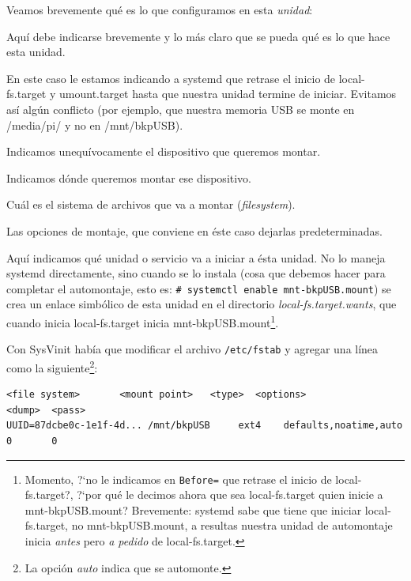 \documentclass[10pt,a4paper]{article}
\begin{document}
Veamos brevemente qu\'e es lo que configuramos en esta \emph{unidad}:

\begin{description}
\label{sec:wantedBy}
    \item [Description=] Aqu\'i debe indicarse brevemente y lo m\'as claro que se pueda qu\'e es lo que hace esta unidad.
    \item [Before=] En este caso le estamos indicando a systemd que retrase el inicio de local-fs.target y umount.target hasta que nuestra unidad termine de iniciar. Evitamos as\'i alg\'un conflicto (por ejemplo, que nuestra memoria USB se monte en /media/pi/ y no en /mnt/bkpUSB).\\
    \item [What=] Indicamos unequ\'ivocamente el dispositivo que queremos montar.
    \item [Where=] Indicamos d\'onde queremos montar ese dispositivo.
    \item [Type=] Cu\'al es el sistema de archivos que va a montar (\emph{filesystem}).
    \item [Options=] Las opciones de montaje, que conviene en \'este caso dejarlas predeterminadas.
    \item [WantedBy=] Aqu\'i indicamos qu\'e unidad o servicio va a iniciar a \'esta unidad. No lo maneja systemd directamente, sino cuando se lo instala (cosa que debemos hacer para completar el automontaje, esto es: \lstinline{# systemctl enable mnt-bkpUSB.mount}) se crea un enlace simb\'olico de esta unidad en el directorio \emph{local-fs.target.wants}, que cuando inicia local-fs.target inicia mnt-bkpUSB.mount\footnote{Momento, ?`no le indicamos en \texttt{Before=} que retrase el inicio de local-fs.target?, ?`por qu\'e le decimos ahora que sea local-fs.target quien inicie a mnt-bkpUSB.mount? Brevemente: systemd sabe que tiene que iniciar local-fs.target, no mnt-bkpUSB.mount, a resultas nuestra unidad de automontaje inicia \emph{antes} pero \emph{a pedido} de local-fs.target.}.
\end{description}

Con SysVinit hab\'ia que modificar el archivo \texttt{/etc/fstab} y agregar una l\'inea como la siguiente\footnote{La opci\'on \emph{auto} indica que se automonte.}:
\begin{scriptsize}
\begin{mdframed}
\begin{verbatim}
<file system>       <mount point>   <type>  <options>               <dump>  <pass>
UUID=87dcbe0c-1e1f-4d... /mnt/bkpUSB     ext4    defaults,noatime,auto   0       0
\end{verbatim}
\end{mdframed}
\end{scriptsize}
\end{document}
